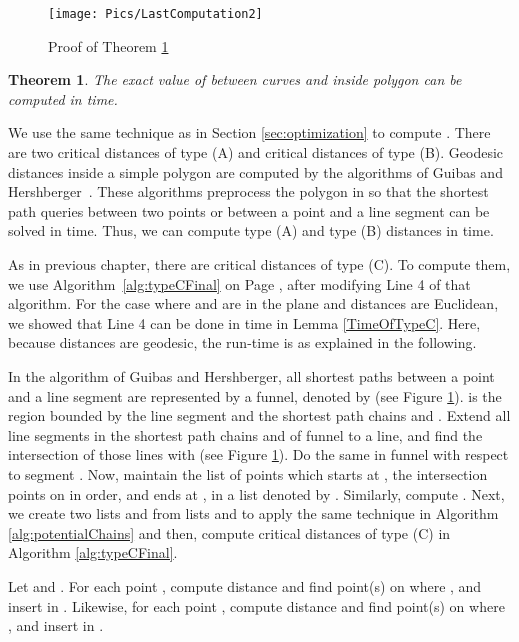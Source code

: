 \documentclass[12pt]{dalthesis}
\def\favoritefont{\bfseries \sffamily}
\def\QED{\ensuremath{{\Box}}}
\def\markatright#1{\leavevmode\unskip\nobreak\quad\hspace*{\fill}{#1}}
\newenvironment{proof}
	{\begin{trivlist}\item[\hskip\labelsep{\favoritefont Proof:}]}
	{\markatright{\QED}\end{trivlist}}
\newtheorem{theorem}{Theorem}
\newcommand{\CF}{{\mathscr F}}
\begin{document}
\begin{figure}[t]
	\centering
	\texttt{[image: Pics/LastComputation2]}  
	\caption{Proof of Theorem \ref{thm:naivePoly}}
	\label{fig:PolyLast}
\end{figure}

\newcommand{\Funn}{\CF}


\begin{theorem} \label{thm:naivePoly}
   The exact value of  between curves  and  inside polygon 
   can be computed in  time.
\end{theorem}
\begin{proof}
We use the same technique as in Section  \ref{sec:optimization}
to compute .
There are two critical distances of type (A) and 
 critical distances of type (B).
Geodesic distances inside a simple polygon 
are computed by the algorithms of Guibas and 
Hershberger~\cite{Guibas86, Hershberger91}.
These algorithms preprocess the polygon in 
so that 
the shortest path queries between two points  or
between a point and a line segment 
can be solved in  time. 
Thus, we can compute type (A) and type (B) distances 
in  time. 




As in previous chapter, 
there are  critical distances of type (C). 
To compute them, we use Algorithm~\ref{alg:typeCFinal} on Page
\pageref{alg:typeCFinal}, 
after modifying Line 4 of that algorithm.
For the case where  and  are in the plane
and distances are Euclidean, we showed 
that Line 4 can be done in  time in Lemma \ref{TimeOfTypeC}. 
Here, because distances are geodesic, the 
run-time is  as explained in the following. 

In the algorithm of Guibas and 
Hershberger, all shortest paths between a point  and a line segment  are represented by a funnel, denoted by  
(see Figure \ref{fig:PolyLast}). 
is the region bounded by the line segment 
and the shortest path chains  and 
. 
Extend all line segments in the shortest path 
chains  and  of funnel 
to a line, and find the intersection of those lines with 
 (see Figure \ref{fig:PolyLast}). Do the same in funnel  with 
respect to segment . Now, maintain
the list of points which starts at 
,  the intersection points on  in order, 
and ends at , 
in a list denoted by  . Similarly, compute .
Next, we create 
two lists  and  from lists  and  to apply 
the same technique in Algorithm \ref{alg:potentialChains} and then, compute
critical distances of type (C)  in Algorithm \ref{alg:typeCFinal}.

Let  and 
. 
For each point , 
compute distance  and
find point(s)  on  where
, and insert  in . 
Likewise, 
for each point , 
compute distance  and
find point(s)  on  where
, and insert  in .


\end{proof}
\end{document}
